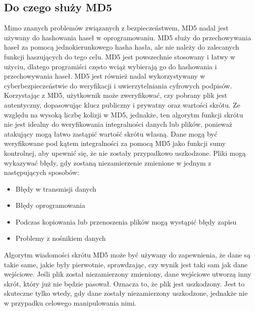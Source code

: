 \documentclass[12pt, a4paper]{article}
\begin{document}
\subsection{Do czego służy MD5}
Mimo znanych problemów związanych z bezpieczeństwem, MD5 nadal jest używany do hashowania haseł w oprogramowaniu. MD5 służy do przechowywania haseł za pomocą jednokierunkowego hasha hasła, ale nie należy do zalecanych funkcji haszujących do tego celu. MD5 jest powszechnie stosowany i łatwy w użyciu, dlatego programiści często wciąż wybierają go do hashowania i przechowywania haseł.
MD5 jest również nadal wykorzystywany w cyberbezpieczeństwie do weryfikacji i uwierzytelniania cyfrowych podpisów. Korzystając z MD5, użytkownik może zweryfikować, czy pobrany plik jest autentyczny, dopasowując klucz publiczny i prywatny oraz wartości skrótu. Ze względu na wysoką liczbę kolizji w MD5, jednakże, ten algorytm funkcji skrótu nie jest idealny do weryfikowania integralności danych lub plików, ponieważ atakujący mogą łatwo zastąpić wartość skrótu własną.
Dane mogą być weryfikowane pod kątem integralności za pomocą MD5 jako funkcji sumy kontrolnej, aby upewnić się, że nie zostały przypadkowo uszkodzone. Pliki mogą wykazywać błędy, gdy zostaną niezamierzenie zmienione w jednym z następujących sposobów:
\begin{itemize}
\item Błędy w transmisji danych
\item Błędy oprogramowania
\item Podczas kopiowania lub przenoszenia plików mogą wystąpić błędy zapisu
\item Problemy z nośnikiem danych
\end{itemize}
Algorytm wiadomości skrótu MD5 może być używany do zapewnienia, że dane są takie same, jakie były pierwotnie, sprawdzając, czy wynik jest taki sam jak dane wejściowe. Jeśli plik został niezamierzony zmieniony, dane wejściowe utworzą inny skrót, który już nie będzie pasował. Oznacza to, że plik jest uszkodzony. Jest to skuteczne tylko wtedy, gdy dane zostały niezamierzony uszkodzone, jednakże nie w przypadku celowego manipulowania nimi.
\end{document}
